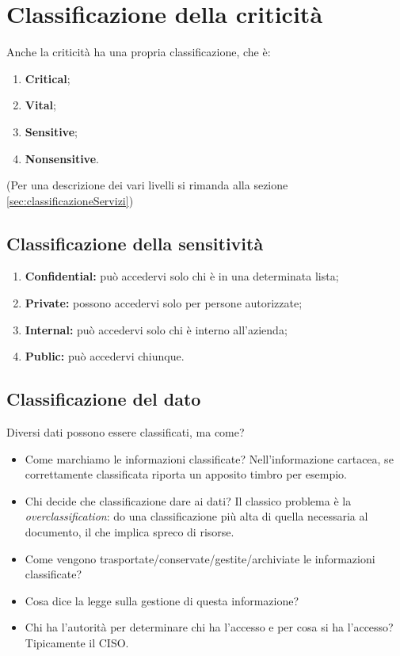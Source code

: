 \section{Classificazione della criticità}

Anche la criticità ha una propria classificazione, che è:
\begin{enumerate}
  \item \textbf{Critical};
  \item \textbf{Vital};
  \item \textbf{Sensitive};
  \item \textbf{Nonsensitive}.
\end{enumerate}
(Per una descrizione dei vari livelli si rimanda alla sezione~
\ref{sec:classificazioneServizi})

\subsection{Classificazione della sensitività}

\begin{enumerate}
\item \textbf{Confidential:} può accedervi solo chi è in una determinata lista;
\item \textbf{Private:} possono accedervi solo per persone autorizzate;
\item \textbf{Internal:} può accedervi solo chi è interno all'azienda;
\item \textbf{Public:} può accedervi chiunque.
\end{enumerate}


\subsection{Classificazione del dato}

Diversi dati possono essere classificati, ma come?

\begin{itemize}
\item Come marchiamo le informazioni classificate? Nell'informazione cartacea,
se correttamente classificata riporta un apposito timbro per esempio.
\item Chi decide che classificazione dare ai dati? Il classico problema è la
\textit{overclassification}: do una classificazione più alta di quella 
necessaria al documento, il che implica spreco di risorse.
\item Come vengono trasportate/conservate/gestite/archiviate le informazioni
classificate?
\item Cosa dice la legge sulla gestione di questa informazione?
\item Chi ha l'autorità per determinare chi ha l'accesso e per cosa si ha
l'accesso? Tipicamente il CISO.
\end{itemize}

